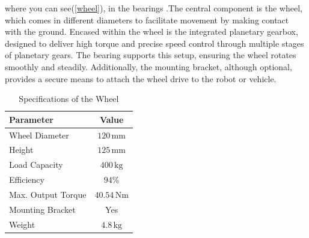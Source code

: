 \documentclass[../../main]{subfiles}
\begin{document}
where you can see(\cref{wheel}), in the bearings .The central component is the wheel, which comes in different diameters to facilitate movement by making contact with the ground. Encased within the wheel is the integrated planetary gearbox, designed to deliver high torque and precise speed control through multiple stages of planetary gears. The bearing supports this setup, ensuring the wheel rotates smoothly and steadily. Additionally, the mounting bracket, although optional, provides a secure means to attach the wheel drive to the robot or vehicle.
\begin{table}[h!]
  \centering
  \begin{tabular}{|l|c|}
      \hline
      \textbf{Parameter} & \textbf{Value} \\ \hline
      Wheel Diameter & $120 \, \mathrm{mm}$ \\ \hline
      Height & $125 \, \mathrm{mm}$ \\ \hline
      Load Capacity & $400 \, \mathrm{kg}$ \\ \hline
      Efficiency & $94 \%$ \\ \hline
      Max. Output Torque & $40.54 \, \mathrm{Nm}$ \\ \hline
      Mounting Bracket & Yes \\ \hline
      Weight & $4.8 \, \mathrm{kg}$ \\ \hline
  \end{tabular}
  \caption{Specifications of the Wheel}
  \label{tab:wheel-specs}
\end{table}
\end{document}
